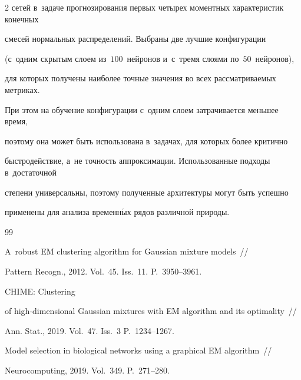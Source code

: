 \begin{multicols}{2}
сетей в~задаче прогнозирования первых четырех моментных характеристик конечных 

смесей нормальных распределений. Выбраны две лучшие конфигурации 

(с~одним скрытым слоем из~$100$~нейронов и~с~тремя слоями по~$50$~нейронов), 

для которых получены наиболее точные значения во всех рас\-смат\-ри\-ва\-емых метриках. 

При этом на обучение конфигурации с~одним слоем затрачивается меньшее время, 

поэтому она может быть использована в~задачах, для которых более критично 

быстродействие, а~не точ\-ность аппроксимации. Использованные подходы в~достаточной 

степени универсальны, поэтому полученные архитектуры могут быть успешно 

применены для анализа временн$\acute{\mbox{ы}}$х рядов различной природы.





{\small\frenchspacing

 {%


 \begin{thebibliography}{99}

  

A~robust EM clustering algorithm for Gaussian mixture models~// 

Pattern Recogn., 2012. Vol.~45. Iss.~11. P.~3950--3961.



  CHIME: Clustering 

of high-dimensional Gaussian mixtures with EM algorithm and its optimality~// 

Ann. Stat., 2019. Vol.~47. Iss.~3 P.~1234--1267.



  

Model selection in biological networks using a graphical EM algorithm~// 

Neurocomputing, 2019. Vol.~349. P.~271--280.



  


\end{thebibliography}}}
\end{multicols}
